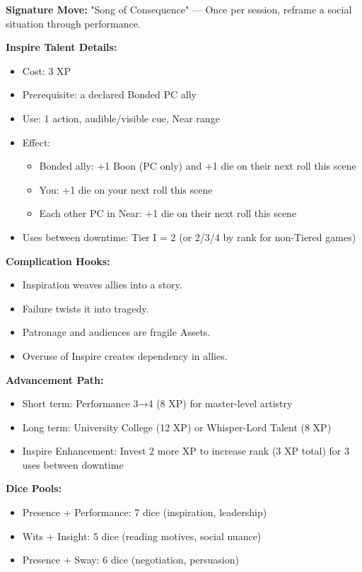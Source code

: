 \textbf{Signature Move:} "Song of Consequence" — Once per session, reframe a social situation through performance.

\textbf{Inspire Talent Details:}
\begin{itemize}
  \item Cost: 3 XP
  \item Prerequisite: a declared Bonded PC ally
  \item Use: 1 action, audible/visible cue, Near range
  \item Effect: 
    \begin{itemize}
      \item Bonded ally: +1 Boon (PC only) and +1 die on their next roll this scene
      \item You: +1 die on your next roll this scene
      \item Each other PC in Near: +1 die on their next roll this scene
    \end{itemize}
  \item Uses between downtime: Tier I = 2 (or 2/3/4 by rank for non-Tiered games)
\end{itemize}

\textbf{Complication Hooks:}
\begin{itemize}
  \item Inspiration weaves allies into a story.
  \item Failure twists it into tragedy.
  \item Patronage and audiences are fragile Assets.
  \item Overuse of Inspire creates dependency in allies.
\end{itemize}

\textbf{Advancement Path:}
\begin{itemize}
  \item Short term: Performance 3→4 (8 XP) for master-level artistry
  \item Long term: University College (12 XP) or Whisper-Lord Talent (8 XP)
  \item Inspire Enhancement: Invest 2 more XP to increase rank (3 XP total) for 3 uses between downtime
\end{itemize}

\textbf{Dice Pools:}
\begin{itemize}
  \item Presence + Performance: 7 dice (inspiration, leadership)
  \item Wits + Insight: 5 dice (reading motives, social nuance)
  \item Presence + Sway: 6 dice (negotiation, persuasion)
\end{itemize}

